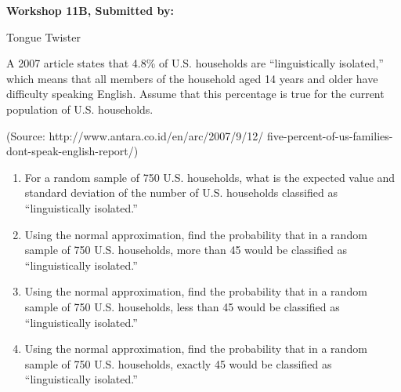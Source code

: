 \documentclass[11pt, chapterprefix=true]{scrbook}\usepackage[]{graphicx}\usepackage[]{color}
\begin{document}
\begin{exercises}
\begin{exercise}
\end{exercise} 
\begin{solution}  %

\end{solution}

\clearpage

    \begin{exercise}  %

    \begin{center}
\begin{flushleft}\textbf{\large \hfill Workshop 11B, Submitted by: }\end{flushleft}

\end{center}

Tongue Twister 

A 2007 article states that 4.8\% of U.S. households are ``linguistically isolated,'' which means that all members of the household aged 14 years and older have difficulty speaking English.  Assume that this percentage is true for the current population of U.S. households. 


 (Source: http://www.antara.co.id/en/arc/2007/9/12/ \newline five-percent-of-us-families-dont-speak-english-report/)


\begin{enumerate}
  \item For a random sample of 750 U.S. households, what is the expected value and standard deviation of the number of U.S. households classified as ``linguistically isolated.''
  \item Using the normal approximation, find the probability that in a random sample of 750 U.S. households, more than 45 would be classified as ``linguistically isolated.'' 
  \item Using the normal approximation, find the probability that in a random sample of 750 U.S. households, less than 45 would be classified as ``linguistically isolated.'' 
  \item Using the normal approximation, find the probability that in a random sample of 750 U.S. households, exactly 45 would be classified as ``linguistically isolated.''
\end{enumerate}  
\end{exercise} 
\begin{solution}  %


\end{solution}
\end{exercises}
\end{document}
